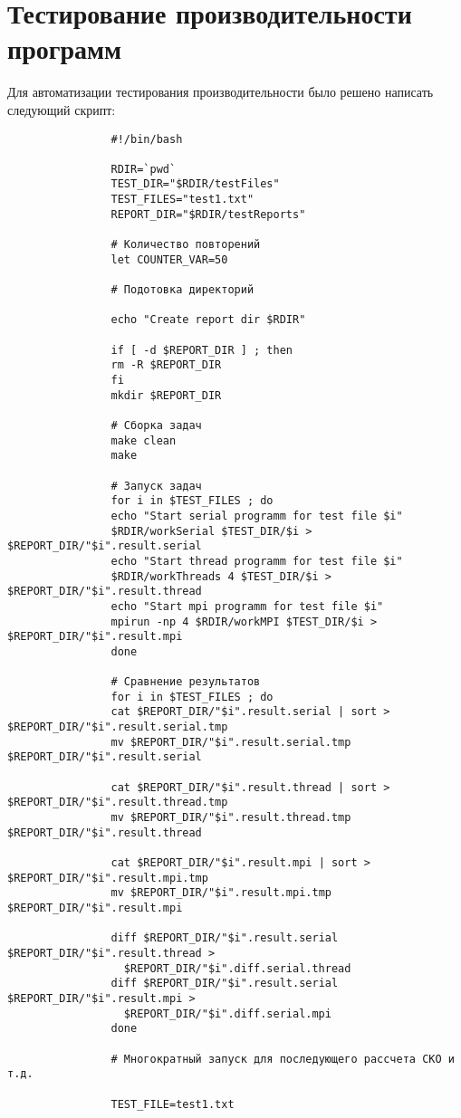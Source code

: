 \documentclass[12pt,a4paper]{report}
\begin{document}
		\section{Тестирование производительности программ}
			Для автоматизации тестирования производительности было решено написать следующий скрипт:
			\begin{verbatim}
				#!/bin/bash
				
				RDIR=`pwd`
				TEST_DIR="$RDIR/testFiles"
				TEST_FILES="test1.txt"
				REPORT_DIR="$RDIR/testReports"
				
				# Количество повторений
				let COUNTER_VAR=50
				
				# Подотовка директорий
				
				echo "Create report dir $RDIR"
				
				if [ -d $REPORT_DIR ] ; then
				rm -R $REPORT_DIR
				fi
				mkdir $REPORT_DIR
				
				# Сборка задач
				make clean
				make
				
				# Запуск задач
				for i in $TEST_FILES ; do
				echo "Start serial programm for test file $i"
				$RDIR/workSerial $TEST_DIR/$i > $REPORT_DIR/"$i".result.serial
				echo "Start thread programm for test file $i"
				$RDIR/workThreads 4 $TEST_DIR/$i > $REPORT_DIR/"$i".result.thread
				echo "Start mpi programm for test file $i"
				mpirun -np 4 $RDIR/workMPI $TEST_DIR/$i > $REPORT_DIR/"$i".result.mpi
				done
				
				# Сравнение результатов
				for i in $TEST_FILES ; do
				cat $REPORT_DIR/"$i".result.serial | sort > $REPORT_DIR/"$i".result.serial.tmp
				mv $REPORT_DIR/"$i".result.serial.tmp $REPORT_DIR/"$i".result.serial

				cat $REPORT_DIR/"$i".result.thread | sort > $REPORT_DIR/"$i".result.thread.tmp
				mv $REPORT_DIR/"$i".result.thread.tmp $REPORT_DIR/"$i".result.thread
				
				cat $REPORT_DIR/"$i".result.mpi | sort > $REPORT_DIR/"$i".result.mpi.tmp
				mv $REPORT_DIR/"$i".result.mpi.tmp $REPORT_DIR/"$i".result.mpi
				
				diff $REPORT_DIR/"$i".result.serial $REPORT_DIR/"$i".result.thread >
				  $REPORT_DIR/"$i".diff.serial.thread
				diff $REPORT_DIR/"$i".result.serial $REPORT_DIR/"$i".result.mpi >
				  $REPORT_DIR/"$i".diff.serial.mpi
				done
				
				# Многократный запуск для последующего рассчета СКО и т.д.
				
				TEST_FILE=test1.txt
				

\end{verbatim}
\end{document}
